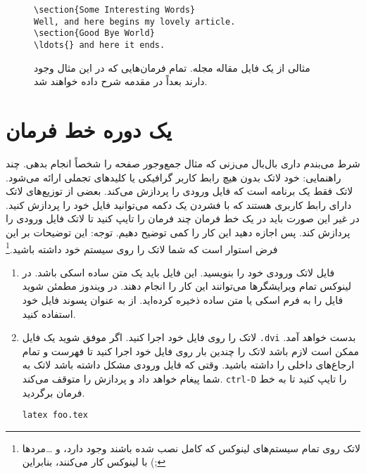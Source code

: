 {\begin{figure}[!htbp]
\begin{lined}{10cm}
\begin{verbatim}
\section{Some Interesting Words}
Well, and here begins my lovely article.
\section{Good Bye World}
\ldots{} and here it ends.

\end{verbatim}
\end{lined}
\setRL
\caption[مثالی از یک فایل مقالهٔ مجله]
{مثالی از یک فایل مقاله مجله.  تمام فرمان‌هایی که در این مثال وجود دارند بعداً در مقدمه شرح داده خواهند شد.} 
\label{document}

\end{figure}
\section{یک دوره خط فرمان}
شرط می‌بندم داری بال‌بال می‌زنی که مثال جمع‌وجور صفحه 
\pageref{mini}
 را شخصاً انجام بدهی. چند راهنمایی: خود لاتک بدون هیچ رابط کاربر گرافیکی
یا کلیدهای تجملی ارائه می‌شود. لاتک فقط یک برنامه است که فایل ورودی را پردازش می‌کند. بعضی از توزیع‌های لاتک دارای رابط کاربری هستند که با فشردن یک دکمه می‌توانید فایل خود را پردازش کنید. در غیر این صورت باید در یک خط فرمان چند فرمان را تایپ کنید تا لاتک فایل ورودی را پردازش کند. پس اجازه دهید این کار را کمی توضیح دهیم. توجه: این توضیحات بر این فرض استوار است که شما لاتک را روی سیستم خود داشته باشید.\footnote{لاتک روی تمام سیستم‌های لینوکس که کامل نصب شده باشند وجود دارد، و \ldots مردها با لینوکس کار می‌کنند، بنابراین (\lr{-};}
\begin{enumerate}
\item 
  فایل لاتک ورودی خود را بنویسید. این فایل باید یک متن ساده اسکی باشد. در لینوکس تمام ویرایشگرها می‌توانند این کار را انجام دهند. در ویندوز مطمئن شوید فایل را به فرم اسکی یا متن ساده ذخیره کرده‌اید. از  به عنوان پسوند فایل خود استفاده کنید.

\item 
لاتک را روی فایل خود اجرا کنید. اگر موفق شوید یک فایل \texttt{.dvi} بدست خواهد آمد. ممکن است لازم باشد لاتک را چندین بار روی فایل خود اجرا کنید تا فهرست و تمام ارجاع‌های داخلی را داشته باشید. وقتی که فایل ورودی مشکل داشته باشد لاتک به شما پیغام خواهد داد و پردازش را متوقف می‌کند. \texttt{ctrl-D} را تایپ کنید تا به خط فرمان برگردید.
\begin{lscommand}
\verb+latex foo.tex+
\end{lscommand}


\end{enumerate}}
